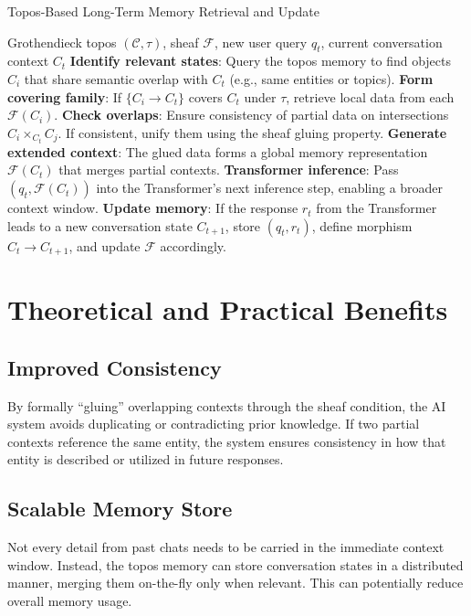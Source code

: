 \documentclass{article}
\begin{document}
\begin{algorithm}[ht]
\caption{Topos-Based Long-Term Memory Retrieval and Update}
\label{alg:topos_memory}
\begin{algorithmic}[1]
\REQUIRE Grothendieck topos $(\mathcal{C}, \tau)$, sheaf $\mathcal{F}$, new user query $q_t$, current conversation context $C_t$
\STATE \textbf{Identify relevant states}: Query the topos memory to find objects $C_i$ that share semantic overlap with $C_t$ (e.g., same entities or topics).
\STATE \textbf{Form covering family}: If $\{C_i \to C_t\}$ covers $C_t$ under $\tau$, retrieve local data from each $\mathcal{F}(C_i)$.
\STATE \textbf{Check overlaps}: Ensure consistency of partial data on intersections $C_i \times_{C_t} C_j$. If consistent, unify them using the sheaf gluing property.
\STATE \textbf{Generate extended context}: The glued data forms a global memory representation $\mathcal{F}(C_t)$ that merges partial contexts.
\STATE \textbf{Transformer inference}: Pass $(q_t, \mathcal{F}(C_t))$ into the Transformer’s next inference step, enabling a broader context window.
\STATE \textbf{Update memory}: If the response $r_t$ from the Transformer leads to a new conversation state $C_{t+1}$, store $(q_t, r_t)$, define morphism $C_t \to C_{t+1}$, and update $\mathcal{F}$ accordingly.
\end{algorithmic}
\end{algorithm}

\section{Theoretical and Practical Benefits}
\label{sec:benefits}

\subsection{Improved Consistency}

By formally “gluing” overlapping contexts through the sheaf condition, the AI system avoids duplicating or contradicting prior knowledge. If two partial contexts reference the same entity, the system ensures consistency in how that entity is described or utilized in future responses.

\subsection{Scalable Memory Store}

Not every detail from past chats needs to be carried in the immediate context window. Instead, the topos memory can store conversation states in a distributed manner, merging them on-the-fly only when relevant. This can potentially reduce overall memory usage.
\end{document}
